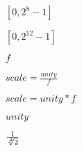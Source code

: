 \documentclass{article}
\begin{document}
$ [0,2^{8}-1] $
\pagebreak

$ [0,2^{12}-1] $
\pagebreak

$ f $
\pagebreak

$ scale = \frac{unity}{f} $
\pagebreak

$ scale = unity * f $
\pagebreak

$ unity $
\pagebreak

$ \frac{1}{\root 4 \of {2}} $
\pagebreak
\end{document}
